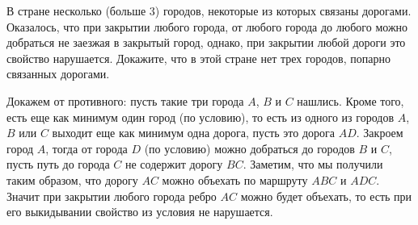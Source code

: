 \problem
В стране несколько (больше 3) городов, некоторые из которых связаны дорогами.
Оказалось, что при закрытии любого города, от любого города до любого можно
добраться не заезжая в закрытый город, однако, при закрытии любой дороги это
свойство нарушается.
Докажите, что в этой стране нет трех городов, попарно связанных дорогами.

\solution
Докажем от противного: пусть такие три города $A$, $B$ и $C$ нашлись.
Кроме того, есть еще как минимум один город (по условию), то есть из одного из
городов $A$, $B$ или $C$ выходит еще как минимум одна дорога, пусть это дорога
$AD$.
Закроем город $A$, тогда от города $D$ (по условию) можно добраться до городов
$B$ и $C$, пусть путь до города $C$ не содержит дорогу $BC$.
Заметим, что мы получили таким образом, что дорогу $AC$ можно объехать по
маршруту $ABC$ и $ADC$.
Значит при закрытии любого города ребро $AC$ можно будет объехать, то есть при
его выкидывании свойство из условия не нарушается.

\endproblem
